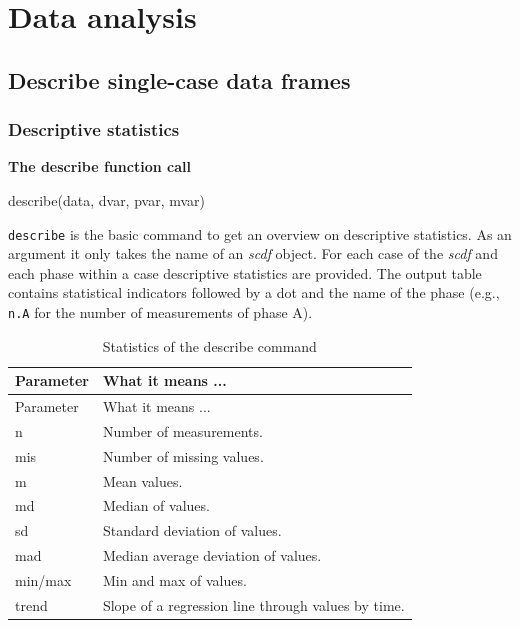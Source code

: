 \documentclass[
  letterpaper,
  DIV=11,
  numbers=noendperiod]{scrreprt}
\begin{document}
\part{Data analysis}

\hypertarget{describe-single-case-data-frames}{%
\chapter{Describe single-case data
frames}\label{describe-single-case-data-frames}}

\hypertarget{descriptive-statistics}{%
\section{Descriptive statistics}\label{descriptive-statistics}}

\begin{tcolorbox}[enhanced jigsaw, breakable, rightrule=.15mm, bottomrule=.15mm, arc=.35mm, colback=white, colframe=quarto-callout-tip-color-frame, opacityback=0, leftrule=.75mm, toprule=.15mm, left=2mm]
\begin{minipage}[t]{5.5mm}
\textcolor{quarto-callout-tip-color}{\faLightbulb}
\end{minipage}%
\begin{minipage}[t]{\textwidth - 5.5mm}

\textbf{The describe function call}\vspace{2mm}

describe(data, dvar, pvar, mvar)

\end{minipage}%
\end{tcolorbox}

\texttt{describe} is the basic command to get an overview on descriptive
statistics. As an argument it only takes the name of an \emph{scdf}
object. For each case of the \emph{scdf} and each phase within a case
descriptive statistics are provided. The output table contains
statistical indicators followed by a dot and the name of the phase
(e.g., \texttt{n.A} for the number of measurements of phase A).

\begin{longtable}[]{@{}ll@{}}
\caption{Statistics of the describe command }\tabularnewline
\toprule()
Parameter & What it means ... \\
\midrule()
\endfirsthead
\toprule()
Parameter & What it means ... \\
\midrule()
\endhead
n & Number of measurements. \\
mis & Number of missing values. \\
m & Mean values. \\
md & Median of values. \\
sd & Standard deviation of values. \\
mad & Median average deviation of values. \\
min/max & Min and max of values. \\
trend & Slope of a regression line through values by time. \\
\bottomrule()
\end{longtable}
\end{document}
